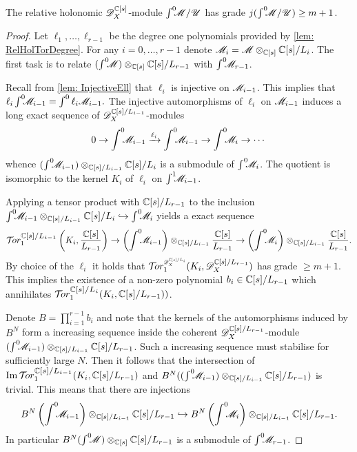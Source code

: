\begin{lemma}\label{lem: GradeNPlusOne}
  The relative holonomic $\mathscr{D}_X^{\mathbb{C}[s]}$-module $\int^0 \mkern -8mu\mathscr{M}/\mathscr{U}$ has grade $j(\int^0 \mkern -8mu\mathscr{M}/\mathscr{U})\geq m+1$.
\end{lemma}
\begin{proof}
  Let $\ell_1,\ldots,\ell_{r-1}$ be the degree one polynomials provided by \cref{lem: RelHolTorDegree}.
  For any $i=0,\ldots, r-1$ denote $\mathscr{M}_i =  \mathscr{M} \otimes_{\mathbb{C}[s]} \mathbb{C}[s]/L_{i}$.
  The first task is to relate $(\int^0 \mkern -8mu\mathscr{M}) \otimes_{\mathbb{C}[s]} \mathbb{C}[s]/L_{r-1}$ with $\int^0 \mkern -8mu\mathscr{M}_{r-1}$.

  Recall from \cref{lem: InjectiveEll} that $\ell_{i}$ is injective on $\mathscr{M}_{i-1}$.
  This implies that
  $\ell_{i}\int^0 \mkern -8mu \mathscr{M}_{i-1} = \int^0 \ell_{i}\mathscr{M}_{i-1}.$
  The injective automorphisms of $\ell_i$ on $\mathscr{M}_{i-1}$ induces a long exact sequence of $\mathscr{D}_X^{\mathbb{C}[s]/L_{i-1}}$-modules
  $$0 \to \int^0 \mkern -8mu\mathscr{M}_{i-1} \xrightarrow{\ell_i} \int^0 \mkern -8mu \mathscr{M}_{i-1} \to \int^0 \mkern -8mu \mathscr{M}_i \to \cdots $$
  whence $(\int^0 \mkern -8mu \mathscr{M}_{i-1})\otimes_{\mathbb{C}[s]/L_{i-1}} \mathbb{C}[s]/L_i$ is a submodule of $\int^0 \mkern -8mu\mathscr{M}_i$.
  The quotient is isomorphic to the kernel $K_i$ of $\ell_i$ on $\int^1\mkern -8mu\mathscr{M}_{i-1}$.

  Applying a tensor product with $\mathbb{C}[s]/L_{r-1}$ to the inclusion $\int^0 \mkern -8mu \mathscr{M}_{i-1} \otimes_{\mathbb{C}[s]/L_{i-1}} \mathbb{C}[s]/L_i \hookrightarrow \int^0 \mkern -8mu\mathscr{M}_i$ yields a exact sequence
  $$\Tr{\C[s]/L_{i-1}}{1}\left(K_i, \frac{\C[s]}{L_{r-1}}\right) \to \left(\Int \M_{i-1}\right) \otimes_{\C[s]/L_{i-1}}\frac{\C[s]}{L_{r-1}} \to \left(\Int\M_i\right) \otimes_{\C[s]/L_{i-1}}\frac{\C[s]}{L_{r-1}}.$$
  By choice of the $\ell_i$ it holds that $\Tr{\D_\X^{\C[s]/L_i} }{1}(K_i, \D_\X^{\C[s]/L_{r-1}})$ has grade $\geq m+1$.
  This implies the existence of a non-zero polynomial $b_i\in \mathbb{C}[s]/L_{r-1}$ which annihilates $\Tr{\C[s]/L_{i}}{1}(K_i, \C[s]/\ab L_{r-1} ))$.

  Denote $B = \prod_{i=1}^{r-1}b_i$ and note that the kernels of the automorphisms induced by $B^N$ form a increasing sequence inside the coherent $\mathscr{D}_X^{\mathbb{C}[s]/L_{r-1}}$-module $(\int^0 \mkern -8mu \mathscr{M}_{i-1})\otimes_{\mathbb{C}[s]/L_{i-1}}\mathbb{C}[s]/L_{r-1}$.
  Such a increasing sequence must stabilise for sufficiently large $N$.
  Then it follows that the intersection of $\img \Tr{\C[s]/L_{i-1}}{1}(K_i, \C[s]/L_{r-1})$ and $ B^N((\int^0 \mkern -8mu \mathscr{M}_{i-1}) \otimes_{\mathbb{C}[s]/L_{i-1}}\mathbb{C}[s]/L_{r-1})$ is trivial.
  This means that there are injections $$B^N \left(\int^0 \mkern -8mu \mathscr{M}_{i-1}\right) \otimes_{\mathbb{C}[s]/L_{i-1}}\mathbb{C}[s]/L_{r-1} \hookrightarrow B^N \left(\int^0 \mkern -8mu\mathscr{M}_i\right)\otimes_{\mathbb{C}[s]/L_{i-1}}\mathbb{C}[s]/L_{r-1}.$$
  In particular $B^N(\int^0 \mkern -8mu\mathscr{M})\otimes_{\mathbb{C}[s]}\mathbb{C}[s]/L_{r-1}$ is a submodule of $\int^0 \mkern -8mu\mathscr{M}_{r-1}$.



\end{proof}
